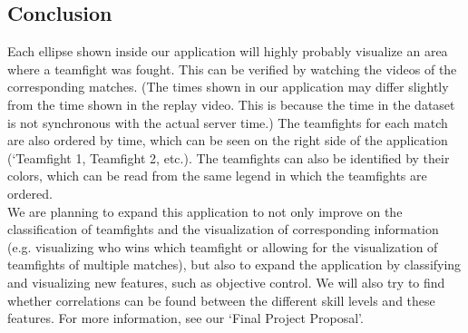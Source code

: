 \documentclass[11pt,twoside,a4paper]{article}
\begin{document}
\subsection*{Conclusion}
Each ellipse shown inside our application will highly probably visualize an area where a teamfight was fought. This can be verified by watching the videos of the corresponding matches. (The times shown in our application may differ slightly from the time shown in the replay video. This is because the time in the dataset is not synchronous with the actual server time.) The teamfights for each match are also ordered by time, which can be seen on the right side of the application (`Teamfight 1, Teamfight 2, etc.). The teamfights can also be identified by their colors, which can be read from the same legend in which the teamfights are ordered.\\
We are planning to expand this application to not only improve on the classification of teamfights and the visualization of corresponding information (e.g. visualizing who wins which teamfight or allowing for the visualization of teamfights of multiple matches), but also to expand the application by classifying and visualizing new features, such as objective control. We will also try to find whether correlations can be found between the different skill levels and these features. For more information, see our `Final Project Proposal'.
\end{document}
